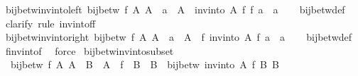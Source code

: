 \begin{isabellebody}
\isamarkupfalse%
%
\endisatagproof
{\isafoldproof}%
%
\isadelimproof
\isanewline
%
\endisadelimproof
\isanewline
{}\isamarkupfalse%
\ bij{\isacharunderscore}{\kern0pt}betw{\isacharunderscore}{\kern0pt}inv{\isacharunderscore}{\kern0pt}into{\isacharunderscore}{\kern0pt}left{\isacharcolon}{\kern0pt}\ {\isachardoublequoteopen}bij{\isacharunderscore}{\kern0pt}betw\ f\ A\ A{\isacharprime}{\kern0pt}\ {\isasymLongrightarrow}\ a\ {\isasymin}\ A\ {\isasymLongrightarrow}\ inv{\isacharunderscore}{\kern0pt}into\ A\ f\ {\isacharparenleft}{\kern0pt}f\ a{\isacharparenright}{\kern0pt}\ {\isacharequal}{\kern0pt}\ a{\isachardoublequoteclose}\isanewline
%
\isadelimproof
\ \ %
\endisadelimproof
%
\isatagproof
{}\isamarkupfalse%
\ bij{\isacharunderscore}{\kern0pt}betw{\isacharunderscore}{\kern0pt}def\ \isamarkupfalse%
\ clarify\ {\isacharparenleft}{\kern0pt}rule\ inv{\isacharunderscore}{\kern0pt}into{\isacharunderscore}{\kern0pt}f{\isacharunderscore}{\kern0pt}f{\isacharparenright}{\kern0pt}%
\endisatagproof
{\isafoldproof}%
%
\isadelimproof
\isanewline
%
\endisadelimproof
\isanewline
{}\isamarkupfalse%
\ bij{\isacharunderscore}{\kern0pt}betw{\isacharunderscore}{\kern0pt}inv{\isacharunderscore}{\kern0pt}into{\isacharunderscore}{\kern0pt}right{\isacharcolon}{\kern0pt}\ {\isachardoublequoteopen}bij{\isacharunderscore}{\kern0pt}betw\ f\ A\ A{\isacharprime}{\kern0pt}\ {\isasymLongrightarrow}\ a{\isacharprime}{\kern0pt}\ {\isasymin}\ A{\isacharprime}{\kern0pt}\ {\isasymLongrightarrow}\ f\ {\isacharparenleft}{\kern0pt}inv{\isacharunderscore}{\kern0pt}into\ A\ f\ a{\isacharprime}{\kern0pt}{\isacharparenright}{\kern0pt}\ {\isacharequal}{\kern0pt}\ a{\isacharprime}{\kern0pt}{\isachardoublequoteclose}\isanewline
%
\isadelimproof
\ \ %
\endisadelimproof
%
\isatagproof
{}\isamarkupfalse%
\ bij{\isacharunderscore}{\kern0pt}betw{\isacharunderscore}{\kern0pt}def\ \isamarkupfalse%
\ f{\isacharunderscore}{\kern0pt}inv{\isacharunderscore}{\kern0pt}into{\isacharunderscore}{\kern0pt}f\ \isamarkupfalse%
\ force%
\endisatagproof
{\isafoldproof}%
%
\isadelimproof
\isanewline
%
\endisadelimproof
\isanewline
{}\isamarkupfalse%
\ bij{\isacharunderscore}{\kern0pt}betw{\isacharunderscore}{\kern0pt}inv{\isacharunderscore}{\kern0pt}into{\isacharunderscore}{\kern0pt}subset{\isacharcolon}{\kern0pt}\isanewline
\ \ {\isachardoublequoteopen}bij{\isacharunderscore}{\kern0pt}betw\ f\ A\ A{\isacharprime}{\kern0pt}\ {\isasymLongrightarrow}\ B\ {\isasymsubseteq}\ A\ {\isasymLongrightarrow}\ f\ {\isacharbackquote}{\kern0pt}\ B\ {\isacharequal}{\kern0pt}\ B{\isacharprime}{\kern0pt}\ {\isasymLongrightarrow}\ bij{\isacharunderscore}{\kern0pt}betw\ {\isacharparenleft}{\kern0pt}inv{\isacharunderscore}{\kern0pt}into\ A\ f{\isacharparenright}{\kern0pt}\ B{\isacharprime}{\kern0pt}\ B{\isachardoublequoteclose}\isanewline

\end{isabellebody}
